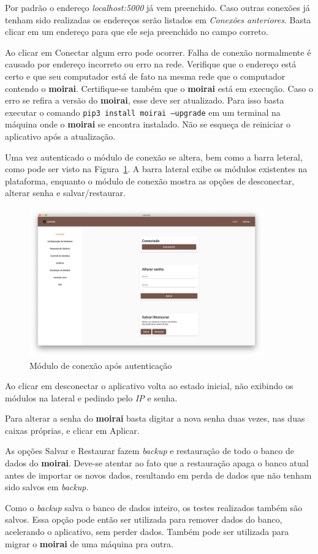 Por padrão o endereço \textit{localhost:5000} já vem preenchido. Caso outras
conexões já tenham sido realizadas os endereços serão listados em
\textit{Conexões anteriores}. Basta clicar em um endereço para que ele seja
preenchido no campo correto.

Ao clicar em Conectar algum erro pode ocorrer. Falha de conexão normalmente é
causado por endereço incorreto ou erro na rede. Verifique que o endereço está
certo e que seu computador está de fato na mesma rede que o computador contendo
o \textbf{moirai}. Certifique-se também que o \textbf{moirai} está em execução.
Caso o erro se refira a versão do \textbf{moirai}, esse deve ser atualizado.
Para isso basta executar o comando \texttt{pip3 install moirai
--upgrade} em um terminal na máquina onde o \textbf{moirai} se encontra
instalado. Não se esqueça de reiniciar o aplicativo após a atualização.

Uma vez autenticado o módulo de conexão se altera, bem como a barra leteral,
como pode ser visto na Figura~\ref{fig:connection-screen}. A barra lateral exibe
os módulos existentes na plataforma, enquanto o módulo de conexão mostra as
opções de desconectar, alterar senha e salvar/restaurar.

\begin{figure}[ht!]
    \centering
    \includegraphics[width=0.9\textwidth]{imgs/connection-screen}
    \caption[Módulo de conexão após autenticação]{Módulo de conexão após autenticação}%
    \label{fig:connection-screen}
\end{figure}

Ao clicar em desconectar o aplicativo volta ao estado inicial, não exibindo os
módulos na lateral e pedindo pelo \textit{IP} e senha.

Para alterar a senha do \textbf{moirai} basta digitar a nova senha duas vezes,
nas duas caixas próprias, e clicar em Aplicar.

As opções Salvar e Restaurar fazem \textit{backup} e restauração de todo o banco
de dados do \textbf{moirai}. Deve-se atentar ao fato que a restauração apaga o
banco atual antes de importar os novos dados, resultando em perda de dados que
não tenham sido salvos em \textit{backup}.

Como o \textit{backup} salva o banco de dados inteiro, os testes realizados
também são salvos. Essa opção pode então ser utilizada para remover dados do
banco, acelerando o aplicativo, sem perder dados. Também pode ser utilizada para
migrar o \textbf{moirai} de uma máquina pra outra.
